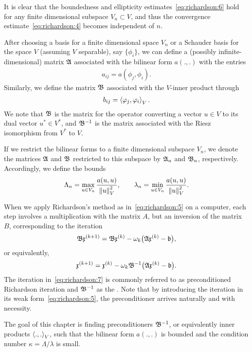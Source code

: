\begin{note}
  It is clear that the boundedness and ellipticity
  estimates~\eqref{eq:richardson:6} hold for any finite dimensional
  subspace $V_n\subset V$, and thus the convergence
  estimate~\eqref{eq:richardson:4} becomes independent of $n$.
\end{note}  

\begin{definition}
  After choosing a basis for a finite dimensional space $V_n$ or a
  Schauder basis for the space $V$ (assuming $V$ separable), say
  $\{\phi_i\}$, we can define a (possibly infinite-dimensional) matrix
  $\mathfrak{A}$ associated with the bilinear form $a(.,.)$ with the entries
  \begin{gather*}
    a_{ij} = a(\phi_j, \phi_i).
  \end{gather*}
  Similarly, we define the matrix $\mathfrak{B}$ associated with the $V$-inner
  product through
  \begin{gather*}
    b_{ij} = \scal(\phi_j,\phi_i)_V.
  \end{gather*}
  We note that $\mathfrak{B}$ is the matrix for the operator converting a vector
  $u\in V$ to its dual vector $u^*\in V^*$, and $\mathfrak{B}^{-1}$ is
  the matrix associated with the Riesz isomorphism from $V^*$ to $V$.
  
  If we restrict the bilinear forms to a finite dimensional subspace
  $V_n$, we denote the matrices $\mathfrak{A}$ and $\mathfrak{B}$ restricted to
  this subspace by $\mathfrak{A}_n$ and $\mathfrak{B}_n$,
  respectively. Accordingly, we define the bounds
  \begin{gather}
    \label{eq:richardson:8}
    \Lambda_n = \max_{u\in V_n}\frac{a(u,u)}{\left\|u\right\|_V^2},
    \qquad
    \lambda_n = \min_{u\in V_n}\frac{a(u,u)}{\left\|u\right\|_V^2}.
  \end{gather}
\end{definition}

\begin{note}
  When we apply Richardson's method as in~\eqref{eq:richardson:5} on a
  computer, each step involves a multiplication with the matrix $A$,
  but an inversion of the matrix $B$, corresponding to the iteration
  \begin{gather*}
    \mathfrak{B} \mathfrak{x}^{(k+1)}
    = \mathfrak{B} \mathfrak{x}^{(k)}
    - \omega_k \bigl(\mathfrak{A} \mathfrak{x}^{(k)} - \mathfrak{b} \bigr),
  \end{gather*}
  or equivalently,
  \begin{gather}
    \label{eq:richardson:7}
    \mathfrak{x}^{(k+1)}
    = \mathfrak{x}^{(k)}
    - \omega_k \mathfrak{B}^{-1}\bigl(\mathfrak{A} \mathfrak{x}^{(k)} - \mathfrak{b} \bigr).
  \end{gather}
  The iteration in~\eqref{eq:richardson:7} is commonly referred to as
  preconditioned Richardson iteration and $\mathfrak{B}^{-1}$ as the
  . Note that by introducing the iteration in
  its weak form~\eqref{eq:richardson:5}, the preconditioner arrives
  naturally and with necessity.
  
  The goal of this chapter is finding preconditioners $\mathfrak{B}^{-1}$, or
  equivalently inner products $\scal(.,.)_V$, such that the bilinear
  form $a(.,.)$ is bounded and the condition number
  $\kappa = \Lambda/\lambda$ is small.
\end{note}

